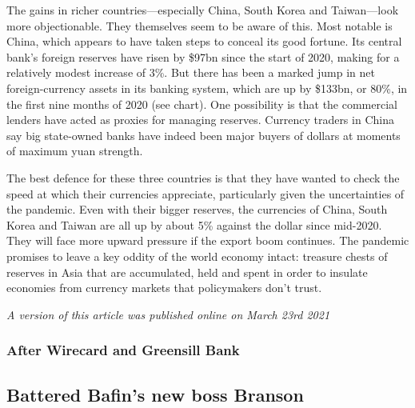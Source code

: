 \documentclass{article}
\begin{document}
The gains in richer countries---especially China, South Korea and Taiwan---look more objectionable. They themselves seem to be aware of this. Most notable is China, which appears to have taken steps to conceal its good fortune. Its central bank's foreign reserves have risen by \$97bn since the start of 2020, making for a relatively modest increase of 3\%. But there has been a marked jump in net foreign-currency assets in its banking system, which are up by \$133bn, or 80\%, in the first nine months of 2020 (see chart). One possibility is that the commercial lenders have acted as proxies for managing reserves. Currency traders in China say big state-owned banks have indeed been major buyers of dollars at moments of maximum yuan strength. 

The best defence for these three countries is that they have wanted to check the speed at which their currencies appreciate, particularly given the uncertainties of the pandemic. Even with their bigger reserves, the currencies of China, South Korea and Taiwan are all up by about 5\% against the dollar since mid-2020. They will face more upward pressure if the export boom continues. The pandemic promises to leave a key oddity of the world economy intact: treasure chests of reserves in Asia that are accumulated, held and spent in order to insulate economies from currency markets that policymakers don't trust.{} 

\emph{A version of this article was published online on March 23rd 2021} 
\clearpage
\subsubsection{After Wirecard and Greensill Bank }
\subsection{Battered Bafin's new boss Branson }
\end{document}
